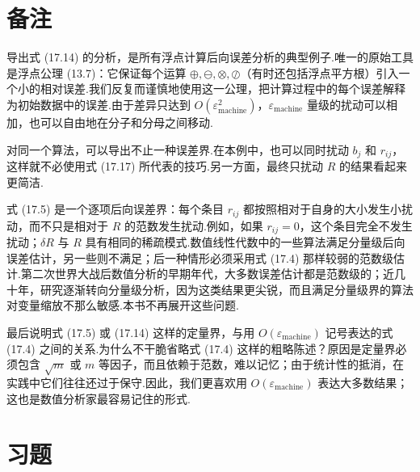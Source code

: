 \documentclass[UTF8,fontset=none,12pt]{ctexart}
\newcommand{\epsmach}{\varepsilon_{\mathrm{machine}}}
\theoremstyle{definition}
\begin{document}
\section*{备注}

导出式 (17.14) 的分析，是所有浮点计算后向误差分析的典型例子.唯一的原始工具是浮点公理 (13.7)：它保证每个运算 $\oplus,\ominus,\otimes,\oslash$（有时还包括浮点平方根）引入一个小的相对误差.我们反复而谨慎地使用这一公理，把计算过程中的每个误差解释为初始数据中的误差.由于差异只达到 $O(\epsmach^2)$，$\epsmach$ 量级的扰动可以相加，也可以自由地在分子和分母之间移动.

对同一个算法，可以导出不止一种误差界.在本例中，也可以同时扰动 $b_j$ 和 $r_{ij}$，这样就不必使用式 (17.17) 所代表的技巧.另一方面，最终只扰动 $R$ 的结果看起来更简洁.

式 (17.5) 是一个逐项后向误差界：每个条目 $r_{ij}$ 都按照相对于自身的大小发生小扰动，而不只是相对于 $R$ 的范数发生扰动.例如，如果 $r_{ij}=0$，这个条目完全不发生扰动；$\delta R$ 与 $R$ 具有相同的稀疏模式.数值线性代数中的一些算法满足分量级后向误差估计，另一些则不满足；后一种情形必须采用式 (17.4) 那样较弱的范数级估计.第二次世界大战后数值分析的早期年代，大多数误差估计都是范数级的；近几十年，研究逐渐转向分量级分析，因为这类结果更尖锐，而且满足分量级界的算法对变量缩放不那么敏感.本书不再展开这些问题.

最后说明式 (17.5) 或 (17.14) 这样的定量界，与用 $O(\epsmach)$ 记号表达的式 (17.4) 之间的关系.为什么不干脆省略式 (17.4) 这样的粗略陈述？原因是定量界必须包含 $\sqrt m$ 或 $m$ 等因子，而且依赖于范数，难以记忆；由于统计性的抵消，在实践中它们往往还过于保守.因此，我们更喜欢用 $O(\epsmach)$ 表达大多数结果；这也是数值分析家最容易记住的形式.

\section*{习题}
\end{document}

